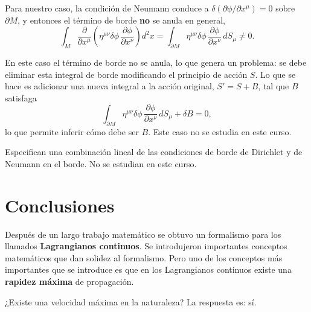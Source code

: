 Para nuestro caso, la condición de Neumann conduce a
$\delta(\partial\phi/\partial x^\mu)=0$ sobre $\partial M$, y entonces
el término de borde \textbf{no} se anula en general,
\[
\int_M \frac{\partial}{\partial x^\mu}\left(\eta^{\mu\nu}\delta\phi\,
\frac{\partial\phi}{\partial x^\nu}\right) d^2x = \int_{\partial M}
\eta^{\mu\nu}\delta\phi\, \frac{\partial\phi}{\partial x^\nu}\, dS_\mu
\neq 0 .
\]

\begin{observacion}
En este caso el término de borde no se anula, lo que genera un problema:
se debe eliminar esta integral de borde modificando el principio de
acción $S$. Lo que se hace es adicionar una nueva integral a la acción
original, $S'=S+B$, tal que $B$ satisfaga
\[
\int_{\partial M} \eta^{\mu\nu}\delta\phi\, \frac{\partial\phi}
{\partial x^\nu}\, dS_\mu + \delta B = 0,
\]
lo que permite inferir cómo debe ser $B$. Este caso no se estudia en
este curso.
\end{observacion}

\begin{definicion}
Especifican una combinación lineal de las condiciones de borde de
Dirichlet y de Neumann en el borde. No se estudian en este curso.
\end{definicion}

\section{Conclusiones}

Después de un largo trabajo matemático se obtuvo un formalismo para los
llamados \textbf{Lagrangianos continuos}. Se introdujeron importantes
conceptos matemáticos que dan solidez al formalismo. Pero uno de los
conceptos más importantes que se introduce es que en los Lagrangianos
continuos existe una \textbf{rapidez máxima} de propagación.

¿Existe una velocidad máxima en la naturaleza? La respuesta es: sí.

